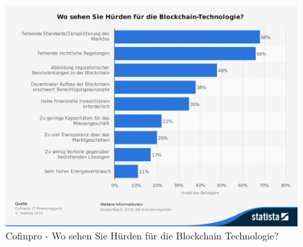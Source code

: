 \begin{figure}[h!]
	\centering
	\includegraphics[width=0.7\linewidth]{pictures/Statista-Huerden-Blockchain-2016}
	\caption[Statista Blockchain Umfrage]{Cofinpro - Wo sehen Sie Hürden für die Blockchain Technologie? \cite{Cofinpro}}
	\label{fig:statista-huerden-blockchain-2016}
\end{figure}


\newpage
